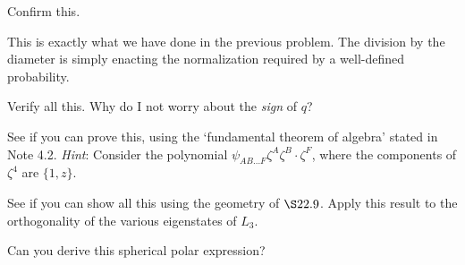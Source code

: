 \documentclass[../road-to-reality.tex]{subfiles}
\begin{document}
\begin{questions}
\question Confirm this.

\begin{solution}
	This is exactly what we have done in the previous problem. The division by the diameter is simply enacting the normalization required by a well-defined probability.
\end{solution}

\question Verify all this. Why do I not worry about the \textit{sign} of $q$?

\question See if you can prove this, using the `fundamental theorem of algebra' stated in Note 4.2. \textit{Hint}: Consider the polynomial $\psi_{AB\dots F}\zeta^A\zeta^B\cdot\zeta^F$, where the components of $\zeta^4$ are $\{1, z\}$.

\question See if you can show all this using the geometry of $\S 22.9$. Apply this result to the orthogonality of the various eigenstates of $L_3$.

\question Can you derive this spherical polar expression?


\end{questions}
\end{document}
